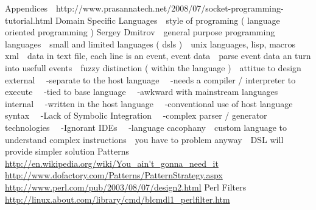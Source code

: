 Appendices
\newline 
http://www.prasannatech.net/2008/07/socket-programming-tutorial.html
Domain Specific Languages
\newline 
style of programing ( language oriented programming ) Sergey Dmitrov
\newline 
general purpose programming languages
\newline 
small and limited languages ( dsls )
\newline 
unix languages, lisp, macros
\newline 
xml
\newline 
data in text file, each line is an event, event data
\newline 
parse event data an turn into usefull events
\newline 
fuzzy distinction ( within the language )
\newline 
attitue to design
\newline 
external
\newline 
 -separate to the host language
\newline 
 -needs a compiler / interpreter to execute
\newline 
 -tied to base language
\newline 
 -awkward with mainstream { languages }
\newline 
internal
\newline 
 -written in the host language
\newline 
 -conventional use of host language syntax
\newline 
 -Lack of Symbolic Integration
\newline 
 -complex parser / generator technologies
\newline 
 -Ignorant IDEs
\newline 
 -language cacophany
\newline 
custom language to understand complex instructions
\newline 
you have to problem anyway
\newline 
DSL will provide simpler solution Patterns
\newline 
\url{http://en.wikipedia.org/wiki/You_ain't_gonna_need_it}
\newline 
\url{http://www.dofactory.com/Patterns/PatternStrategy.aspx}
\newline 
\url{http://www.perl.com/pub/2003/08/07/design2.html}
Perl Filters 
\newline 
\url{http://linux.about.com/library/cmd/blcmdl1_perlfilter.htm}    

